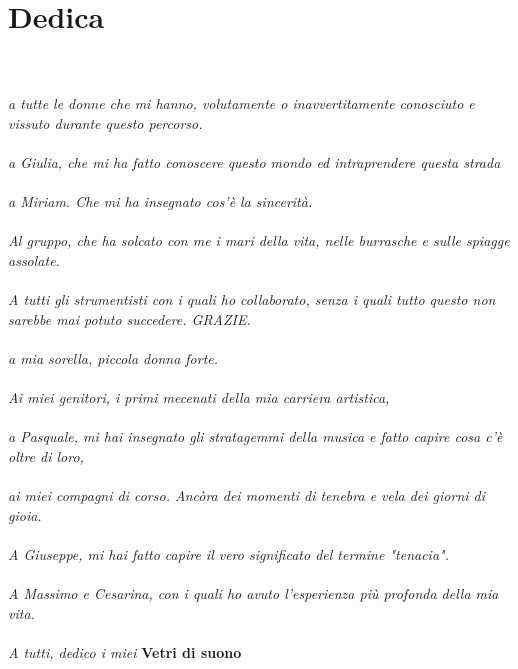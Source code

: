 
\chapter*{Dedica}


\textit{
\\
\\
a tutte le donne che mi hanno, volutamente o inavvertitamente conosciuto e vissuto durante questo percorso. \\
\\
a Giulia, che mi ha fatto conoscere questo mondo ed intraprendere questa strada \\
\\
a Miriam. Che mi ha insegnato cos'è la sincerità. \\
\\
Al gruppo, che ha solcato con me i mari della vita, nelle burrasche e sulle spiagge assolate. \\
\\
A tutti gli strumentisti con i quali ho collaborato, senza i quali tutto questo non sarebbe mai potuto succedere. GRAZIE. \\
\\
a mia sorella, piccola donna forte. \\
\\
Ai miei genitori, i primi mecenati della mia carriera artistica, \\
\\
a Pasquale, mi hai insegnato gli stratagemmi della musica e fatto capire cosa c'è oltre di loro, \\
\\
ai miei compagni di corso. Ancòra dei momenti di tenebra e vela dei giorni di gioia. \\
\\
A Giuseppe, mi hai fatto capire il vero significato del termine "tenacia". \\
\\
A Massimo e Cesarina, con i quali ho avuto l'esperienza più profonda della mia vita. \\
\\
A tutti, dedico i miei} \textbf{Vetri di suono} \\
\\